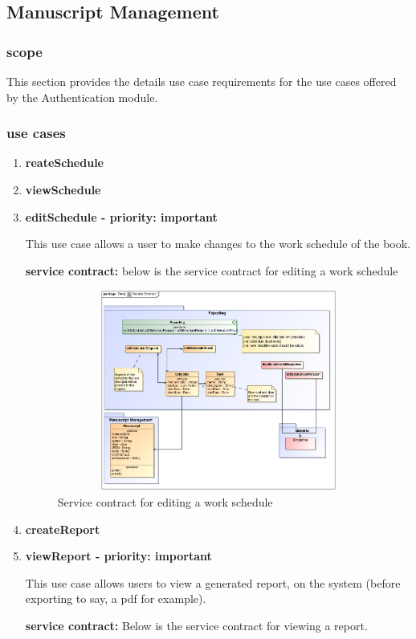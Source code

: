 \documentclass[12pt]{article}
\begin{document}
\subsection{Manuscript Management}

\subsubsection{scope}
\par{This section provides the details use case requirements for the use cases offered by the Authentication
module.}

\subsubsection{use cases}

\begin{enumerate}
\item \textbf{reateSchedule}
\item \textbf{viewSchedule}
\item \textbf{editSchedule - priority: important}\\
\par{This use case allows a user to make changes to the work schedule of the book.}
\par{\textbf{service contract:} below is the service contract for editing a work schedule}

\begin{figure}[h]
\includegraphics[height=250px, width=500px]{epsImages/Reporting/editScheduleServiceContract.eps}
\caption{Service contract for editing a work schedule}
\end{figure}

\item \textbf{createReport}
\item \textbf{viewReport - priority: important}\\
\par{This use case allows users to view a generated report, on the system (before exporting to say, a pdf for example).}\\
\par{\textbf{service contract:} Below is the service contract for viewing a report.}


\end{enumerate}
\end{document}
